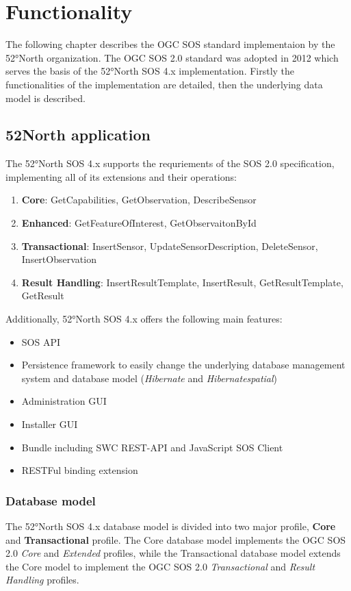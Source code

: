 \chapter{Functionality}
The following chapter describes the OGC SOS standard implementaion by the
52°North organization. The OGC SOS 2.0 standard was adopted in 2012 which
serves the basis of the 52°North SOS 4.x implementation. Firstly the
functionalities of the implementation are detailed, then the underlying data model is described.

\section{52North application}
The 52°North SOS 4.x supports the requriements of the SOS 2.0 specification,
implementing all of its extensions and their operations:
\begin{enumerate}
    \item \textbf{Core}: GetCapabilities, GetObservation, DescribeSensor
    \item \textbf{Enhanced}: GetFeatureOfInterest, GetObservaitonById
    \item \textbf{Transactional}: InsertSensor, UpdateSensorDescription, DeleteSensor,
            InsertObservation
    \item \textbf{Result Handling}: InsertResultTemplate, InsertResult, GetResultTemplate,
            GetResult
\end{enumerate}

Additionally, 52°North SOS 4.x offers the following main features:
\begin{itemize}
    \item SOS API
    \item Persistence framework to easily change the underlying database
    management system and database model (\textit{Hibernate} and
    \textit{Hibernatespatial})
    \item Administration GUI
    \item Installer GUI
    \item Bundle including SWC REST-API and JavaScript SOS Client
    \item RESTFul binding extension
\end{itemize}

\subsection{Database model}
The 52°North SOS 4.x database model is divided into two major profile,
\textbf{Core} and \textbf{Transactional} profile. The Core database model
implements the OGC SOS 2.0 \textit{Core} and \textit{Extended} profiles, while
the Transactional database model extends the Core model to implement the OGC SOS
2.0 \textit{Transactional} and \textit{Result Handling} profiles. 

